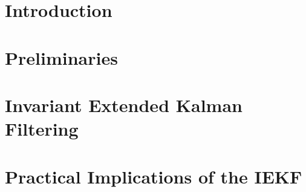 \documentclass[reqno, 12pt, onesidie]{report}
\begin{document}
\cleardoublepage


\cleardoublepage

\cleardoublepage
\setcounter{page}{1}
\renewcommand{\thepage}{\arabic{page}}


\cleardoublepage
\startthechapters



\cleardoublepage
    \chapter{Introduction}
    \label{chap:Intro}
    

\cleardoublepage
    \chapter{Preliminaries}
    \label{chap:preliminaries}
    


\cleardoublepage
    \chapter{Invariant Extended Kalman Filtering}
    \label{chap:IEKF}
    

\cleardoublepage
    \chapter{Practical Implications of the IEKF}
    \label{chap:SE3}
    
\end{document}
